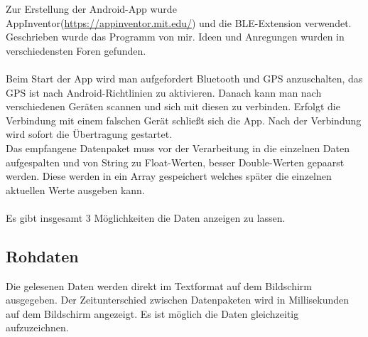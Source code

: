 Zur Erstellung der Android-App wurde AppInventor(\url{https://appinventor.mit.edu/}) und 
die BLE-Extension verwendet.\\
Geschrieben wurde das Programm von mir. Ideen und Anregungen wurden in verschiedensten 
Foren gefunden. \\
\\
Beim Start der App wird man aufgefordert Bluetooth und GPS anzuschalten, das GPS
ist nach Android-Richtlinien zu aktivieren. Danach kann man nach verschiedenen
Geräten scannen und sich mit diesen zu verbinden. Erfolgt die Verbindung mit einem
falschen Gerät schließt sich die App. Nach der Verbindung wird sofort die Übertragung 
gestartet.\\
Das empfangene Datenpaket muss vor der Verarbeitung in die einzelnen Daten
aufgespalten und von String zu Float-Werten, besser Double-Werten gepaarst werden.
Diese werden in ein Array gespeichert welches später
die einzelnen aktuellen Werte ausgeben kann.\\
\\
Es gibt insgesamt 3 Möglichkeiten die Daten anzeigen zu lassen.

\subsection{Rohdaten}
Die gelesenen Daten werden direkt im Textformat auf dem Bildschirm ausgegeben.
Der Zeitunterschied zwischen Datenpaketen wird in Millisekunden auf dem Bildschirm
angezeigt.
Es ist möglich die Daten gleichzeitig aufzuzeichnen.

